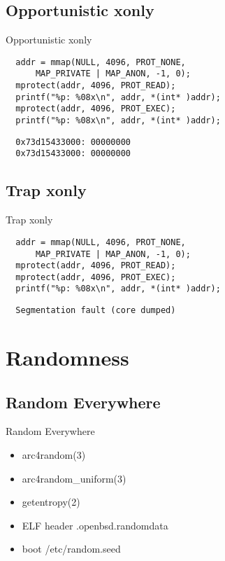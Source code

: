 \documentclass[14pt,aspectratio=169]{beamer}
\begin{document}
\subsection{Opportunistic xonly}
\begin{frame}[fragile=singleslide]{Opportunistic xonly}
\begin{verbatim}
  addr = mmap(NULL, 4096, PROT_NONE,
      MAP_PRIVATE | MAP_ANON, -1, 0);
  mprotect(addr, 4096, PROT_READ);
  printf("%p: %08x\n", addr, *(int* )addr);
  mprotect(addr, 4096, PROT_EXEC);
  printf("%p: %08x\n", addr, *(int* )addr);
\end{verbatim}
\begin{verbatim}
  0x73d15433000: 00000000
  0x73d15433000: 00000000
\end{verbatim}
\end{frame}

\subsection{Trap xonly}
\begin{frame}[fragile=singleslide]{Trap xonly}
\begin{verbatim}
  addr = mmap(NULL, 4096, PROT_NONE,
      MAP_PRIVATE | MAP_ANON, -1, 0);
  mprotect(addr, 4096, PROT_READ);
  mprotect(addr, 4096, PROT_EXEC);
  printf("%p: %08x\n", addr, *(int* )addr);
\end{verbatim}
\begin{verbatim}
  Segmentation fault (core dumped)
\end{verbatim}
\end{frame}

\section{Randomness}

\subsection{Random Everywhere}
\begin{frame}{Random Everywhere}
\begin{itemize}
  \item arc4random(3)
  \item arc4random\_uniform(3)
  \item getentropy(2)
  \item ELF header .openbsd.randomdata
  \item boot /etc/random.seed
\end{itemize}
\end{frame}
\end{document}

